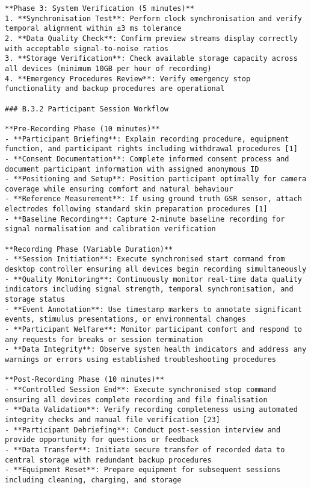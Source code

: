 \begin{verbatim}
**Phase 3: System Verification (5 minutes)**
1. **Synchronisation Test**: Perform clock synchronisation and verify temporal alignment within ±3 ms tolerance
2. **Data Quality Check**: Confirm preview streams display correctly with acceptable signal-to-noise ratios
3. **Storage Verification**: Check available storage capacity across all devices (minimum 10GB per hour of recording)
4. **Emergency Procedures Review**: Verify emergency stop functionality and backup procedures are operational

### B.3.2 Participant Session Workflow

**Pre-Recording Phase (10 minutes)**
- **Participant Briefing**: Explain recording procedure, equipment function, and participant rights including withdrawal procedures [1]
- **Consent Documentation**: Complete informed consent process and document participant information with assigned anonymous ID
- **Positioning and Setup**: Position participant optimally for camera coverage while ensuring comfort and natural behaviour
- **Reference Measurement**: If using ground truth GSR sensor, attach electrodes following standard skin preparation procedures [1]
- **Baseline Recording**: Capture 2-minute baseline recording for signal normalisation and calibration verification

**Recording Phase (Variable Duration)**
- **Session Initiation**: Execute synchronised start command from desktop controller ensuring all devices begin recording simultaneously
- **Quality Monitoring**: Continuously monitor real-time data quality indicators including signal strength, temporal synchronisation, and storage status
- **Event Annotation**: Use timestamp markers to annotate significant events, stimulus presentations, or environmental changes
- **Participant Welfare**: Monitor participant comfort and respond to any requests for breaks or session termination
- **Data Integrity**: Observe system health indicators and address any warnings or errors using established troubleshooting procedures

**Post-Recording Phase (10 minutes)**
- **Controlled Session End**: Execute synchronised stop command ensuring all devices complete recording and file finalisation
- **Data Validation**: Verify recording completeness using automated integrity checks and manual file verification [23]
- **Participant Debriefing**: Conduct post-session interview and provide opportunity for questions or feedback
- **Data Transfer**: Initiate secure transfer of recorded data to central storage with redundant backup procedures
- **Equipment Reset**: Prepare equipment for subsequent sessions including cleaning, charging, and storage


\end{verbatim}
